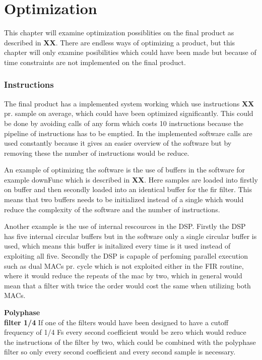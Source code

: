 \chapter{Optimization}
This chapter will examine optimization possiblities on the final product as described in \textbf{XX}. There are endless ways of optimizing a product, but this chapter will only examine posibilities which could have been made but because of time constraints are not implemented on the final product. 

\subsection*{Instructions}
The final product has a implemented system working which use instructions \textbf{XX} pr. sample on average, which could have been optimized significantly. This could be done by avoiding calls of any form which costs 10 instructions because the pipeline of instructions has to be emptied. In the implemented software calls are used constantly because it gives an easier overview of the software but by removing these the number of instructions would be reduce. 

An example of optimizing the software is the use of buffers in the software for example downFunc which is described in \textbf{XX}. Here samples are loaded into firstly on buffer and then secondly loaded into an identical buffer for the fir filter. This means that two buffers needs to be initialized instead of a single which would reduce the complexity of the software and the number of instructions. 

Another example is the use of internal rescources in the DSP. Firstly the DSP has five internal circular buffers but in the software only a single circular buffer is used, which means this buffer is initalized every time is it used instead of exploiting all five. Secondly the DSP is capaple of perfoming parallel execution such as dual MACs pr. cycle which is not exploited either in the FIR routine, where it would reduce the repeats of the mac by two, which in general would mean that a filter with twice the order would cost the same when utilizing both MACs. 

\textbf{Polyphase}\\
\textbf{filter 1/4}
If one of the filters would have been designed to have a cutoff frequency of 1/4 Fs every second coefficient would be zero which would reduce the instructions of the filter by two, which could be combined with the polyphase filter so only every second coefficient and every second sample is necessary.  

